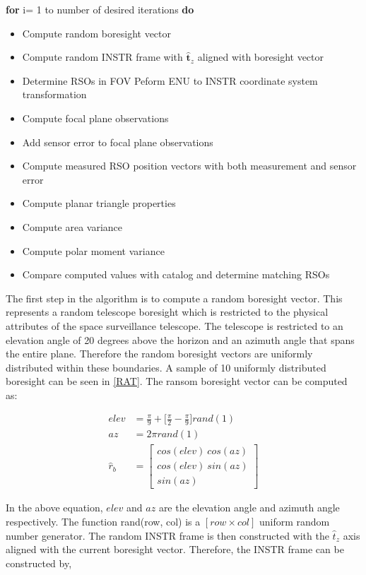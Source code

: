 \documentclass[]{aiaa-tc}%
\begin{document}
\textbf{for} i= 1 to number of desired iterations \textbf{do}

\begin{itemize}
\item Compute random boresight vector
\item Compute random INSTR frame with $\hat{\textbf{t}}_z$ aligned with boresight vector
\item Determine RSOs in FOV
Peform ENU to INSTR coordinate system transformation
\item Compute focal plane observations
\item Add sensor error to focal plane observations
\item Compute measured RSO position vectors with both measurement and sensor error
\item Compute planar triangle properties
\item Compute area variance
\item Compute polar moment variance
\item Compare computed values with catalog and determine matching RSOs
\end{itemize}




The first step in the algorithm is to compute a random boresight vector. This represents a random
telescope boresight which is restricted to the physical attributes of the space surveillance telescope. The telescope is restricted to an elevation angle of 20 degrees above the
horizon and an azimuth angle that spans the entire plane. Therefore the random boresight vectors
are uniformly distributed within these boundaries. A sample of 10 uniformly distributed boresight can be seen in \cref{RAT}. The ransom boresight vector can be computed as:

\begin{subequations}
\begin{align}
 elev &= \frac{\pi}{9} +\big[\frac{\pi}{2} -\frac{\pi}{9} \big] rand(1)\\
 az &= 2\pi rand(1)\\
 \hat{r}_b &=  \begin{bmatrix}
  cos(elev) ~cos(az)\\
  cos(elev) ~sin(az)\\
  sin(az) 
 \end{bmatrix} \label{subeqnc}
\end{align}
\end{subequations}

In the above equation, $elev$ and $az$ are the elevation angle and azimuth angle respectively. The function rand(row, col) is a $[row \times col]$ uniform random number generator. The random INSTR frame is then constructed with the $\hat{t}_z$ axis aligned with the current boresight vector. Therefore, the INSTR frame can be constructed by,
\end{document}
